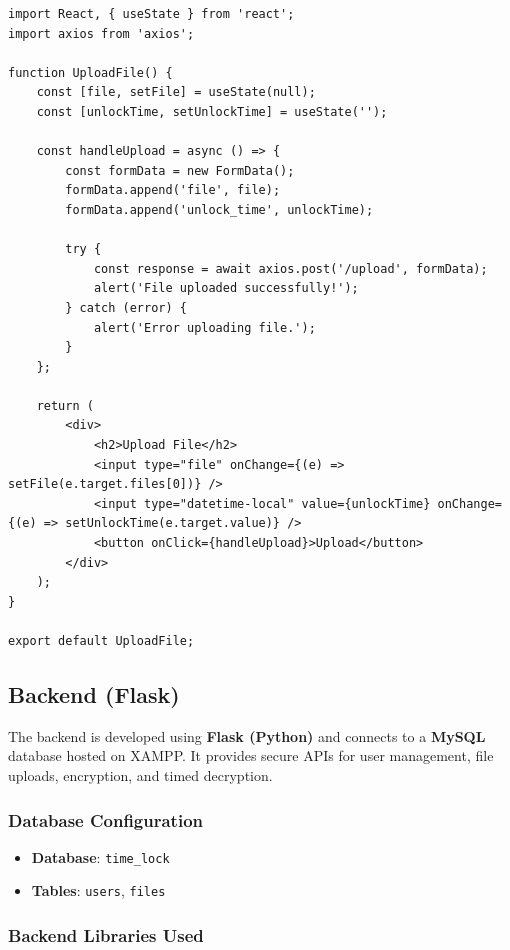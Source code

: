\documentclass[12pt]{article}
\begin{document}
\begin{verbatim}
import React, { useState } from 'react';
import axios from 'axios';

function UploadFile() {
    const [file, setFile] = useState(null);
    const [unlockTime, setUnlockTime] = useState('');

    const handleUpload = async () => {
        const formData = new FormData();
        formData.append('file', file);
        formData.append('unlock_time', unlockTime);

        try {
            const response = await axios.post('/upload', formData);
            alert('File uploaded successfully!');
        } catch (error) {
            alert('Error uploading file.');
        }
    };

    return (
        <div>
            <h2>Upload File</h2>
            <input type="file" onChange={(e) => setFile(e.target.files[0])} />
            <input type="datetime-local" value={unlockTime} onChange={(e) => setUnlockTime(e.target.value)} />
            <button onClick={handleUpload}>Upload</button>
        </div>
    );
}

export default UploadFile;
\end{verbatim}

\subsection{Backend (Flask)}\label{sec:system}

The backend is developed using \textbf{Flask (Python)} and connects to a \textbf{MySQL} database hosted on XAMPP. It provides secure APIs for user management, file uploads, encryption, and timed decryption.

\subsubsection{Database Configuration}

\begin{itemize}
    \item \textbf{Database}: \texttt{time\_lock}
    \item \textbf{Tables}: \texttt{users}, \texttt{files}
\end{itemize}

\subsubsection{Backend Libraries Used}
\end{document}
